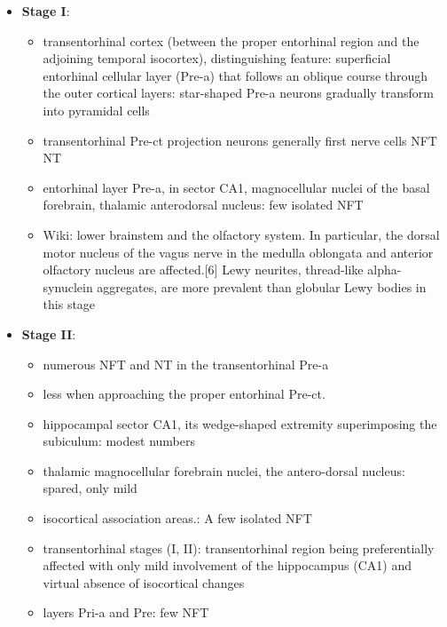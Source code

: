 \documentclass[fleqn]{article}\usepackage{caption}
\begin{document}
\begin{itemize}
\begin{itemize}
\item \textbf{Stage I}:
\begin{itemize}
\item transentorhinal cortex (between the proper entorhinal region and the adjoining
temporal isocortex), distinguishing feature: superficial entorhinal cellular layer (Pre-a)
that follows an oblique course through the outer cortical
layers: star-shaped Pre-a neurons gradually transform into pyramidal cells
\item transentorhinal Pre-ct projection neurons generally first nerve cells NFT NT
\item entorhinal layer Pre-a, in sector CA1, magnocellular nuclei of the basal forebrain, thalamic anterodorsal nucleus: few isolated NFT 
\item Wiki: 
lower brainstem and the olfactory system. In particular, the dorsal motor nucleus of the vagus nerve in the medulla oblongata and anterior olfactory nucleus are affected.[6] Lewy neurites, thread-like alpha-synuclein aggregates, are more prevalent than globular Lewy bodies in this stage
\end{itemize}


\item \textbf{Stage II}:
\begin{itemize}

\item numerous NFT and NT in the transentorhinal Pre-a 
\item less when  approaching the proper entorhinal Pre-ct. 

\item hippocampal sector CA1, its wedge-shaped extremity superimposing the subiculum: modest numbers 
\item thalamic magnocellular forebrain nuclei, the antero-dorsal nucleus: spared, only mild
\item isocortical association areas.: A few isolated NFT 
\item transentorhinal stages (I, II): transentorhinal region being preferentially affected with only mild involvement of the hippocampus (CA1) and virtual absence of isocortical changes 
\item layers Pri-a and Pre: few NFT

\end{itemize}


\end{itemize}
\end{itemize}
\end{document}

